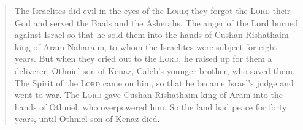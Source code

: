\documentclass{mycworkshop}
\begin{document}
\begin{quote}
  \textbf{} The Israelites did evil in the eyes of the
  \textsc{Lord}; they forgot the \textsc{Lord} their God and served the Baals
  and the Asherahs. The anger of the \textsf{Lord} burned against Israel
  so that he sold them into the hands of Cushan-Rishathaim king of Aram
  Naharaim, to whom the Israelites were subject for eight years. But
  when they cried out to the \textsc{Lord}, he raised up for them a deliverer,
  Othniel son of Kenaz, Caleb's younger brother, who saved them. The
  Spirit of the \textsc{Lord} came on him, so that he became Israel's judge
  and went to war. The \textsc{Lord} gave Cushan-Rishathaim king of Aram into
  the hands of Othniel, who overpowered him. So the land had peace for
  forty years, until Othniel son of Kenaz died.
\end{quote}


\vfill

\nocite{*}

\printbibliography[title=Book Recommendations]
\end{document}
